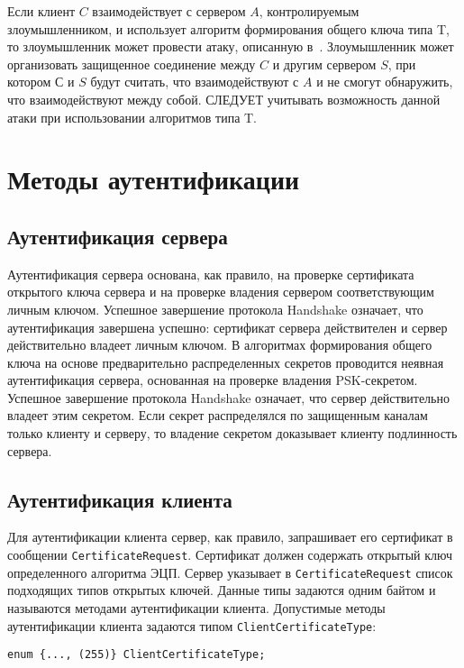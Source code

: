 \begin{note}
Если клиент $C$ взаимодействует с сервером $A$, контролируемым злоумышленником,
и использует алгоритм формирования общего ключа типа T, то злоумышленник может
провести атаку, описанную в~\cite{TripleHandshake}. Злоумышленник может
организовать защищенное соединение между $C$ и другим сервером $S$,  при котором
$С$ и $S$ будут считать, что взаимодействуют с $A$ и не смогут обнаружить, что
взаимодействуют между собой. СЛЕДУЕТ учитывать возможность данной атаки при
использовании алгоритмов типа T.
\end{note}

\section{Методы аутентификации}\label{CRYPTO.3}

\subsection{Аутентификация сервера}\label{CRYPTO.3.1}

Аутентификация сервера основана, как правило, на проверке сертификата 
открытого ключа сервера и на проверке владения сервером соответствующим 
личным ключом. Успешное завершение протокола Handshake означает, что 
аутентификация завершена успешно: сертификат сервера действителен и 
сервер действительно владеет личным ключом. 
В алгоритмах формирования общего ключа на основе предварительно 
распределенных секретов проводится неявная аутентификация сервера, 
основанная на проверке владения PSK-секретом. Успешное завершение 
протокола Handshake означает, что сервер действительно владеет этим 
секретом. Если секрет распределялся по защищенным каналам только клиенту 
и серверу, то владение секретом доказывает клиенту подлинность сервера. 

\subsection{Аутентификация клиента}\label{CRYPTO.3.2}

Для аутентификации клиента сервер, как правило, запрашивает его сертификат 
в сообщении \lstinline{CertificateRequest}. Сертификат должен содержать 
открытый ключ определенного алгоритма ЭЦП. Сервер указывает в 
\lstinline{CertificateRequest} список подходящих типов открытых ключей. 
Данные типы задаются одним байтом и  
называются методами аутентификации клиента. 
Допустимые методы аутентификации клиента задаются типом 
\lstinline{ClientCertificateType}:
\begin{lstlisting}
enum {..., (255)} ClientCertificateType;
\end{lstlisting}

